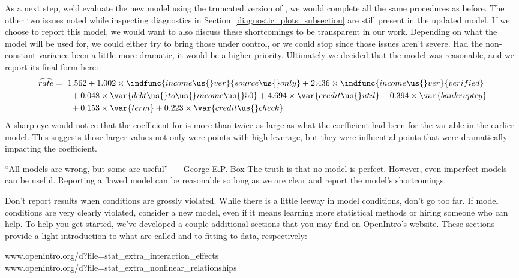 As a next step, we'd evaluate the new model using
the truncated version of ,
we would complete all the same procedures as before.
The other two issues noted while inspecting diagnostics
in Section~\ref{diagnostic_plots_subsection} are still
present in the updated model.
If we choose to report this model, we would want to also
discuss these shortcomings to be transparent in our work.
Depending on what the model will be used for, we could either
try to bring those under control, or we could stop since
those issues aren't severe.
Had the non-constant variance been a little more dramatic,
it would be a higher priority.
Ultimately we decided that the model was reasonable,
and we report its final form here:
\begin{align*}
\widehat{rate} &= \ 1.562
    + 1.002 \times \indfunc{income\us{}ver}{source\us{}only}
    + 2.436 \times \indfunc{income\us{}ver}{verified} \\
  &\qquad
    + 0.048 \times \var{debt\us{}to\us{}income\us{}50}
    + 4.694 \times \var{credit\us{}util}
    + 0.394 \times \var{bankruptcy} \\
  &\qquad
    + 0.153 \times \var{term}
    + 0.223 \times \var{credit\us{}check}
\end{align*}
A sharp eye would notice that the coefficient for
 is more than twice
as large as what the coefficient had been for the
 variable in the earlier model.
This suggests those larger values not only were points
with high leverage, but they were influential points that
were dramatically impacting the coefficient.

\begin{onebox}{``All models are wrong,
    but some are useful''~~~-George E.P. Box}
  The truth is that no model is perfect.
  However, even imperfect models can be useful.
  Reporting a flawed model can be reasonable so long
  as we are clear and report the model's shortcomings.
\end{onebox}

Don't report results when conditions are grossly violated.
While there is a little leeway in model conditions,
don't go too far.
If model conditions are very clearly violated,
consider a new model, even if it means learning more
statistical methods or hiring someone who can help.
To help you get started, we've developed a couple additional
sections that you may find on OpenIntro's website.
These sections provide a light introduction to what are
called 
and to fitting
%
to data, respectively:
\begin{center}
    {www.openintro.org/d?file=stat\_extra\_interaction\_effects}
  \\[3mm]
    {www.openintro.org/d?file=stat\_extra\_nonlinear\_relationships}
\end{center}

